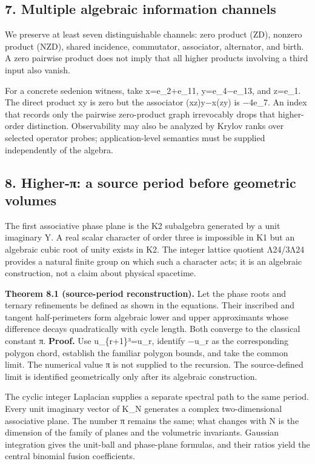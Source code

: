 \documentclass[
  10pt,
]{article}
\begin{document}
\subsection{7. Multiple algebraic information
channels}\label{multiple-algebraic-information-channels}

We preserve at least seven distinguishable channels: zero product (ZD),
nonzero product (NZD), shared incidence, commutator, associator,
alternator, and birth. A zero pairwise product does not imply that all
higher products involving a third input also vanish.

For a concrete sedenion witness, take x=e\_2+e\_11, y=e\_4−e\_13, and
z=e\_1. The direct product xy is zero but the associator (xz)y−x(zy) is
−4e\_7. An index that records only the pairwise zero-product graph
irrevocably drops that higher-order distinction. Observability may also
be analyzed by Krylov ranks over selected operator probes;
application-level semantics must be supplied independently of the
algebra.

\subsection{8. Higher-π: a source period before geometric
volumes}\label{higher-ux3c0-a-source-period-before-geometric-volumes}

The first associative phase plane is the K2 subalgebra generated by a
unit imaginary Y. A real scalar character of order three is impossible
in K1 but an algebraic cubic root of unity exists in K2. The integer
lattice quotient Λ24/3Λ24 provides a natural finite group on which such
a character acts; it is an algebraic construction, not a claim about
physical spacetime.

\textbf{Theorem 8.1 (source-period reconstruction).} Let the phase roots
and ternary refinements be defined as shown in the equations. Their
inscribed and tangent half-perimeters form algebraic lower and upper
approximants whose difference decays quadratically with cycle length.
Both converge to the classical constant π. \textbf{Proof.} Use
u\_\{r+1\}³=u\_r, identify −u\_r\textbar{} as the corresponding
polygon chord, establish the familiar polygon bounds, and take the
common limit. The numerical value π is not supplied to the recursion.
The source-defined limit is identified geometrically only after its
algebraic construction.

The cyclic integer Laplacian supplies a separate spectral path to the
same period. Every unit imaginary vector of K\_N generates a complex
two-dimensional associative plane. The number π remains the same; what
changes with N is the dimension of the family of planes and the
volumetric invariants. Gaussian integration gives the unit-ball and
phase-plane formulas, and their ratios yield the central binomial fusion
coefficients.
\end{document}
